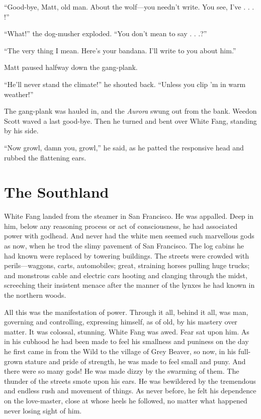 \documentclass[10pt]{book}
\begin{document}
“Good-bye, Matt, old man. About the wolf—you needn’t write. You see,
I’ve . . . !”

“What!” the dog-musher exploded. “You don’t mean to say . . .?”

“The very thing I mean. Here’s your bandana. I’ll write to you about
him.”

Matt paused halfway down the gang-plank.

“He’ll never stand the climate!” he shouted back. “Unless you clip ’m
in warm weather!”

The gang-plank was hauled in, and the \emph{Aurora} swung out from the bank.
Weedon Scott waved a last good-bye. Then he turned and bent over White
Fang, standing by his side.

“Now growl, damn you, growl,” he said, as he patted the responsive head
and rubbed the flattening ears.

\chapter{The Southland}

White Fang landed from the steamer in San Francisco. He was appalled.
Deep in him, below any reasoning process or act of consciousness, he
had associated power with godhead. And never had the white men seemed
such marvellous gods as now, when he trod the slimy pavement of San
Francisco. The log cabins he had known were replaced by towering
buildings. The streets were crowded with perils—waggons, carts,
automobiles; great, straining horses pulling huge trucks; and monstrous
cable and electric cars hooting and clanging through the midst,
screeching their insistent menace after the manner of the lynxes he had
known in the northern woods.

All this was the manifestation of power. Through it all, behind it all,
was man, governing and controlling, expressing himself, as of old, by
his mastery over matter. It was colossal, stunning. White Fang was
awed. Fear sat upon him. As in his cubhood he had been made to feel his
smallness and puniness on the day he first came in from the Wild to the
village of Grey Beaver, so now, in his full-grown stature and pride of
strength, he was made to feel small and puny. And there were so many
gods! He was made dizzy by the swarming of them. The thunder of the
streets smote upon his ears. He was bewildered by the tremendous and
endless rush and movement of things. As never before, he felt his
dependence on the love-master, close at whose heels he followed, no
matter what happened never losing sight of him.
\end{document}
